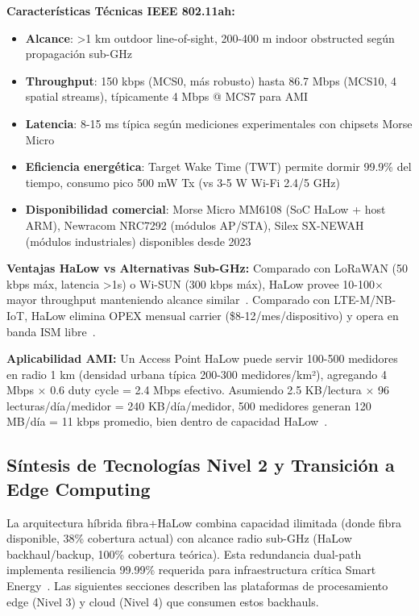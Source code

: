 \textbf{Características Técnicas IEEE 802.11ah:}
\begin{itemize}
\item \textbf{Alcance}: >1 km outdoor line-of-sight, 200-400 m indoor obstructed según propagación sub-GHz~\cite{adameTimeVariantChannelModeling2019,liEstimatingPropagationCharacteristics2024}
\item \textbf{Throughput}: 150 kbps (MCS0, más robusto) hasta 86.7 Mbps (MCS10, 4 spatial streams), típicamente 4 Mbps @ MCS7 para AMI~\cite{IEEE802.11ah-2016}
\item \textbf{Latencia}: 8-15 ms típica según mediciones experimentales con chipsets Morse Micro~\cite{khorovSurveyIEEE802112016}
\item \textbf{Eficiencia energética}: Target Wake Time (TWT) permite dormir 99.9\% del tiempo, consumo pico 500 mW Tx (vs 3-5 W Wi-Fi 2.4/5 GHz)~\cite{IEEE802.11ah-2016}
\item \textbf{Disponibilidad comercial}: Morse Micro MM6108 (SoC HaLow + host ARM), Newracom NRC7292 (módulos AP/STA), Silex SX-NEWAH (módulos industriales) disponibles desde 2023~\cite{morsemicroMM61082024}
\end{itemize}

\textbf{Ventajas HaLow vs Alternativas Sub-GHz:} Comparado con LoRaWAN (50 kbps máx, latencia >1s) o Wi-SUN (300 kbps máx), HaLow provee 10-100$\times$ mayor throughput manteniendo alcance similar~\cite{khorovSurveyIEEE802112016}. Comparado con LTE-M/NB-IoT, HaLow elimina OPEX mensual carrier (\$8-12/mes/dispositivo) y opera en banda ISM libre~\cite{adameTimeVariantChannelModeling2019}.

\textbf{Aplicabilidad AMI:} Un Access Point HaLow puede servir 100-500 medidores en radio 1 km (densidad urbana típica 200-300 medidores/km²), agregando 4 Mbps $\times$ 0.6 duty cycle = 2.4 Mbps efectivo. Asumiendo 2.5 KB/lectura $\times$ 96 lecturas/día/medidor = 240 KB/día/medidor, 500 medidores generan 120 MB/día = 11 kbps promedio, bien dentro de capacidad HaLow~\cite{alsafranChallengesImplementingIoT2025}.

\subsection{Síntesis de Tecnologías Nivel 2 y Transición a Edge Computing}

La arquitectura híbrida fibra+HaLow combina capacidad ilimitada (donde fibra disponible, 38\% cobertura actual) con alcance radio sub-GHz (HaLow backhaul/backup, 100\% cobertura teórica). Esta redundancia dual-path implementa resiliencia 99.99\% requerida para infraestructura crítica Smart Energy~\cite{alsafranChallengesImplementingIoT2025}. Las siguientes secciones describen las plataformas de procesamiento edge (Nivel 3) y cloud (Nivel 4) que consumen estos backhauls.

